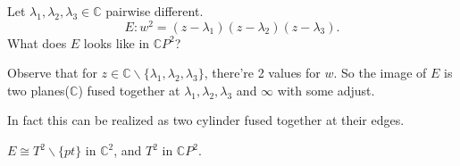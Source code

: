 \begin{example}
    Let $\lambda_1, \lambda_2, \lambda_3\in \mathbb{C}$ pairwise different.
	\[
	E: w^2 = (z-\lambda_1)(z-\lambda_2)(z-\lambda_3).
	\]
	What does $E$ looks like in $\mathbb{C}P^2$?

	Observe that for $z\in \mathbb{C}\backslash\{\lambda_1,\lambda_2,\lambda_3\}$,
	there're 2 values for $w$.
	So the image of $E$ is two planes($\mathbb{C}$) fused together
	at $\lambda_1, \lambda_2, \lambda_3$ and $\infty$ with some adjust.

	In fact this can be realized as two cylinder fused together at their edges.

	$E\cong T^2 \backslash \{pt\}$ in $\mathbb{C}^2$, and $T^2$ in $\mathbb{C}P^2$.
\end{example}
